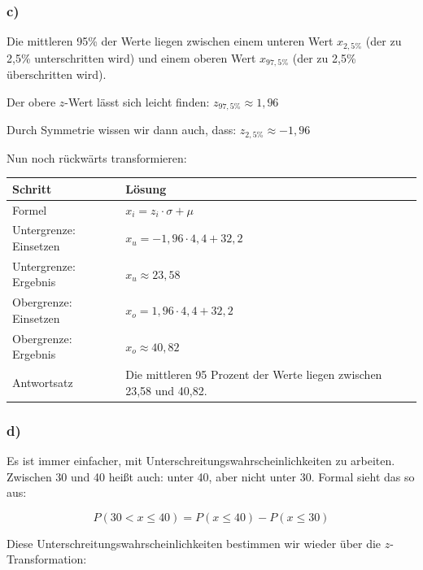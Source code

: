 \documentclass[
  11pt,
  ngerman,
  a4paper,
]{report}
\begin{document}
\hypertarget{c-7}{%
\subsubsection{c)}\label{c-7}}

Die mittleren 95\% der Werte liegen zwischen einem unteren Wert \(x_{2{,}5\%}\) (der zu 2,5\% unterschritten wird) und einem oberen Wert \(x_{97{,}5\%}\) (der zu 2,5\% überschritten wird).

Der obere \(z\)-Wert lässt sich leicht finden: \(z_{97{,}5\%} \approx 1{,}96\)

Durch Symmetrie wissen wir dann auch, dass: \(z_{2{,}5\%} \approx -1{,}96\)

Nun noch rückwärts transformieren:

\begin{table}[H]
\centering
\begin{tabular}{ll}
\toprule
Schritt & Lösung\\
\midrule
Formel & $x_{i} = z_{i} \cdot \sigma + \mu$\\
Untergrenze: Einsetzen & $x_{u} = -1{,}96 \cdot 4{,}4 + 32{,}2$\\
Untergrenze: Ergebnis & $x_{u}\approx23{,}58$\\
Obergrenze: Einsetzen & $x_{o} = 1{,}96 \cdot 4{,}4 + 32{,}2$\\
Obergrenze: Ergebnis & $x_{o}\approx40{,}82$\\
Antwortsatz & Die mittleren 95 Prozent der Werte liegen zwischen 23,58 und 40,82.\\
\bottomrule
\end{tabular}
\end{table}

\hypertarget{d-2}{%
\subsubsection{d)}\label{d-2}}

Es ist immer einfacher, mit Unterschreitungs­wahrscheinlichkeiten zu arbeiten. Zwischen 30 und 40 heißt auch: unter 40, aber nicht unter 30. Formal sieht das so aus:

\[P(30 < x \leq 40) = P(x \leq 40) - P(x \leq 30)\]

Diese Unterschreitungs­wahrscheinlichkeiten bestimmen wir wieder über die \(z\)-Transformation:
\end{document}
